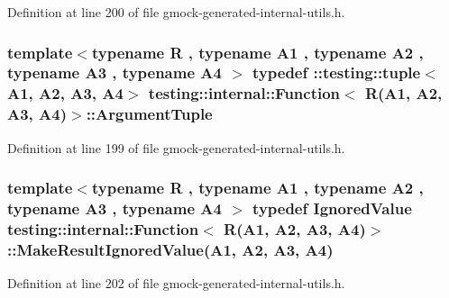 Definition at line 200 of file gmock-\/generated-\/internal-\/utils.\+h.

\subsubsection[{\texorpdfstring{Argument\+Tuple}{ArgumentTuple}}]{\setlength{\rightskip}{0pt plus 5cm}template$<$typename R , typename A1 , typename A2 , typename A3 , typename A4 $>$ typedef \+::testing\+::tuple$<$A1, A2, A3, A4$>$ {\bf testing\+::internal\+::\+Function}$<$ {\bf R}(A1, A2, A3, A4)$>$\+::{\bf Argument\+Tuple}}\hypertarget{structtesting_1_1internal_1_1_function_3_01_r_07_a1_00_01_a2_00_01_a3_00_01_a4_08_4_a8ad9e0ae57a766f80a9816ad45626812}{}\label{structtesting_1_1internal_1_1_function_3_01_r_07_a1_00_01_a2_00_01_a3_00_01_a4_08_4_a8ad9e0ae57a766f80a9816ad45626812}


Definition at line 199 of file gmock-\/generated-\/internal-\/utils.\+h.

\subsubsection[{\texorpdfstring{Make\+Result\+Ignored\+Value}{MakeResultIgnoredValue}}]{\setlength{\rightskip}{0pt plus 5cm}template$<$typename R , typename A1 , typename A2 , typename A3 , typename A4 $>$ typedef {\bf Ignored\+Value} {\bf testing\+::internal\+::\+Function}$<$ {\bf R}(A1, A2, A3, A4)$>$\+::Make\+Result\+Ignored\+Value(A1, A2, A3, A4)}\hypertarget{structtesting_1_1internal_1_1_function_3_01_r_07_a1_00_01_a2_00_01_a3_00_01_a4_08_4_a6736086d1c8ba25788add1e5180207f9}{}\label{structtesting_1_1internal_1_1_function_3_01_r_07_a1_00_01_a2_00_01_a3_00_01_a4_08_4_a6736086d1c8ba25788add1e5180207f9}


Definition at line 202 of file gmock-\/generated-\/internal-\/utils.\+h.


